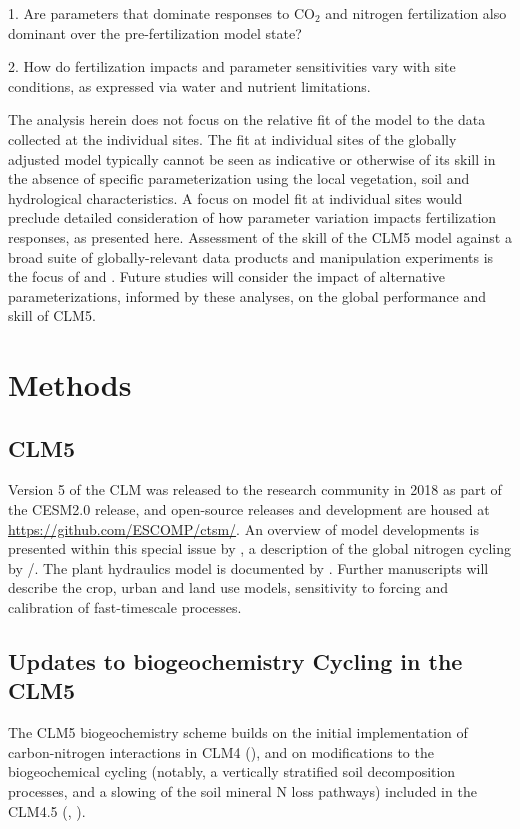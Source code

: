 \documentclass[draft,linenumbers]{agujournal}
\begin{document}
1. Are parameters that dominate responses to CO$_{2}$ and nitrogen fertilization also dominant over the pre-fertilization model state?

2. How do fertilization impacts and parameter sensitivities vary with site conditions, as expressed via water and nutrient limitations. 

The analysis herein does not focus on the relative fit of the model to the data collected at the individual sites. The fit at individual sites of the globally adjusted model typically cannot be seen as indicative or otherwise of its skill in the absence of specific parameterization using the local vegetation, soil and hydrological characteristics. A focus on model fit at individual sites would preclude detailed consideration of how parameter variation impacts fertilization responses, as presented here. Assessment of the skill of the CLM5 model against a broad suite of globally-relevant data products and manipulation experiments is the focus of \cite{lawrence2018} and \cite{wieder2019}. Future studies will consider the impact of alternative parameterizations, informed by these analyses, on the global performance and skill of CLM5.

\section{Methods}

\subsection{CLM5}
 Version 5 of the CLM was released to the research community in 2018 as part of the CESM2.0 release, and open-source releases and development are housed at \url{https://github.com/ESCOMP/ctsm/}. An overview of model developments is presented within this special issue by \cite{lawrence2018}, a description of the global nitrogen cycling by \cite{wieder2019}/. The plant hydraulics model is documented by \cite{kennedy2019}. Further manuscripts will describe the crop, urban and land use models, sensitivity to forcing and calibration of fast-timescale processes.
 
\subsection{Updates to biogeochemistry Cycling in the CLM5}
The CLM5 biogeochemistry scheme builds on the initial implementation of carbon-nitrogen interactions in CLM4 (\cite{thornton2007}),  and on modifications to the biogeochemical cycling (notably, a vertically stratified soil decomposition processes, and a slowing of the soil mineral N loss pathways) included in the CLM4.5 (\cite{koven2013}, \cite{bonan2012}). 
\end{document}
